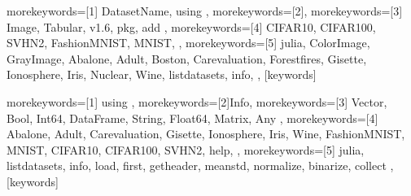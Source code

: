 \lstset{style = juliastyle, language = julia}


{%
morekeywords=[1]{
    DatasetName, using%
},%
morekeywords=[2]{},%
morekeywords=[3]{
    Image, Tabular, v1.6, pkg, add
},
morekeywords=[4]{
    CIFAR10, CIFAR100, SVHN2, FashionMNIST, MNIST,
},
morekeywords=[5]{
    julia,
    ColorImage, GrayImage, Abalone, Adult, Boston, Carevaluation, Forestfires,
    Gisette, Ionosphere, Iris, Nuclear, Wine,
    listdatasets, info,
},
}[keywords]

{%
morekeywords=[1]{
    using
},%
morekeywords=[2]{Info},%
morekeywords=[3]{
    Vector, Bool, Int64, DataFrame, String, Float64, Matrix, Any
},
morekeywords=[4]{
    Abalone, Adult, Carevaluation, Gisette, Ionosphere, Iris, Wine, FashionMNIST, MNIST, CIFAR10, CIFAR100, SVHN2, help,
},
morekeywords=[5]{
    julia, listdatasets, info, load, first, getheader, meanstd, normalize, binarize, collect
},
}[keywords]